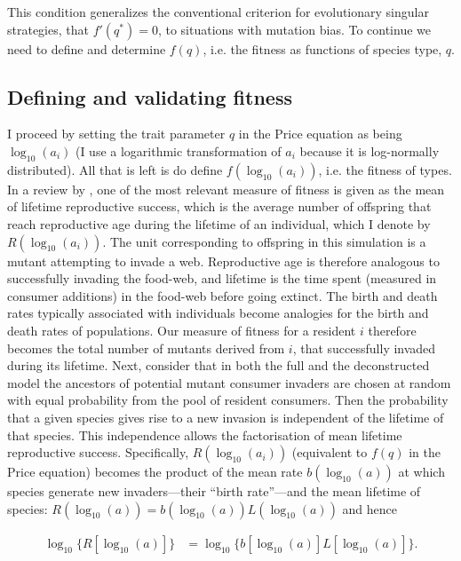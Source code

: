 \documentclass[a4paper]{report}
\DeclareMathOperator{\log}{log}
\begin{document}
This condition generalizes the conventional criterion for evolutionary
singular strategies, that $f'(q^*)=0$, to situations with mutation bias. To continue we need to define and determine $f(q)$, i.e. the fitness as functions of species type, $q$. \\

\subsection{Defining and validating fitness}

I proceed by setting the trait parameter $q$ in the Price equation as being $\log_{10}(a_i)$ (I use a logarithmic transformation of $a_i$ because it is log-normally distributed). All that is left is do define $f(\log_{10}(a_i))$, i.e. the fitness of types. In a review by \citep{Metz}, one of the most relevant measure of fitness is given as the  mean of lifetime reproductive success, which is the average number of offspring that reach reproductive age during the lifetime of an individual, which I denote by $R(\log_{10}(a_i))$. The unit corresponding to offspring in this simulation is a mutant attempting to invade a web. Reproductive age is therefore analogous to successfully invading the food-web, and lifetime is the time spent (measured in consumer additions) in the food-web before going extinct. The birth and death rates typically associated with individuals become analogies for the birth and death rates of populations. Our measure of fitness for a resident $i$ therefore becomes the total number of mutants derived from $i$, that successfully invaded during its lifetime. Next, consider that in both the full and the
deconstructed model the ancestors of potential mutant consumer invaders are chosen at random with equal probability from the pool of
resident consumers. Then the probability that a given species gives rise to
a new invasion is independent of the lifetime of that species. This independence allows the factorisation of mean lifetime reproductive success. Specifically, $R(\log_{10}(a_i))$ (equivalent to $f(q)$ in the Price equation) 
becomes the product of the mean rate $b(\log_{10}(a))$ at which species generate
new invaders---their ``birth rate''---and the mean lifetime of
species: $R(\log_{10}(a)) = b(\log_{10}(a))L(\log_{10}(a))$ and hence

\begin{align}
  \label{eq:R-factorise}
  \log_{10}\{R[\log_{10}( a)]\} &= \log_{10}\{b[\log_{10}(a)]L[\log_{10}(a)]\}.
\end{align}
\end{document}
